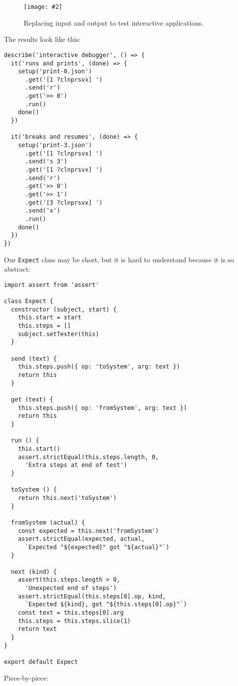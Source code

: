 \documentclass[krantzl]{krantz}
\newcommand{\figpdf}[4]{\begin{figure}%
\centering%
\texttt{[image: \#2]}%
\caption{#3}%
\label{#1}%
\end{figure}}
\begin{document}
\figpdf{debugger-test-interact}{./debugger/test-interact.pdf}{Replacing input and output to test interactive applications.}{0.6}


The results look like this:


\begin{lstlisting}[frame=tblr]
describe('interactive debugger', () => {
  it('runs and prints', (done) => {
    setup('print-0.json')
      .get('[1 ?clnprsvx] ')
      .send('r')
      .get('>> 0')
      .run()
    done()
  })

  it('breaks and resumes', (done) => {
    setup('print-3.json')
      .get('[1 ?clnprsvx] ')
      .send('s 3')
      .get('[1 ?clnprsvx] ')
      .send('r')
      .get('>> 0')
      .get('>> 1')
      .get('[3 ?clnprsvx] ')
      .send('x')
      .run()
    done()
  })
})
\end{lstlisting}



Our \texttt{Expect} class may be short,
but it is hard to understand because it is so abstract:


\begin{lstlisting}[frame=tblr]
import assert from 'assert'

class Expect {
  constructor (subject, start) {
    this.start = start
    this.steps = []
    subject.setTester(this)
  }

  send (text) {
    this.steps.push({ op: 'toSystem', arg: text })
    return this
  }

  get (text) {
    this.steps.push({ op: 'fromSystem', arg: text })
    return this
  }

  run () {
    this.start()
    assert.strictEqual(this.steps.length, 0,
      'Extra steps at end of test')
  }

  toSystem () {
    return this.next('toSystem')
  }

  fromSystem (actual) {
    const expected = this.next('fromSystem')
    assert.strictEqual(expected, actual,
      `Expected "${expected}" got "${actual}"`)
  }

  next (kind) {
    assert(this.steps.length > 0,
      'Unexpected end of steps')
    assert.strictEqual(this.steps[0].op, kind,
      `Expected ${kind}, got "${this.steps[0].op}"`)
    const text = this.steps[0].arg
    this.steps = this.steps.slice(1)
    return text
  }
}

export default Expect
\end{lstlisting}



\noindent Piece-by-piece:
\end{document}
